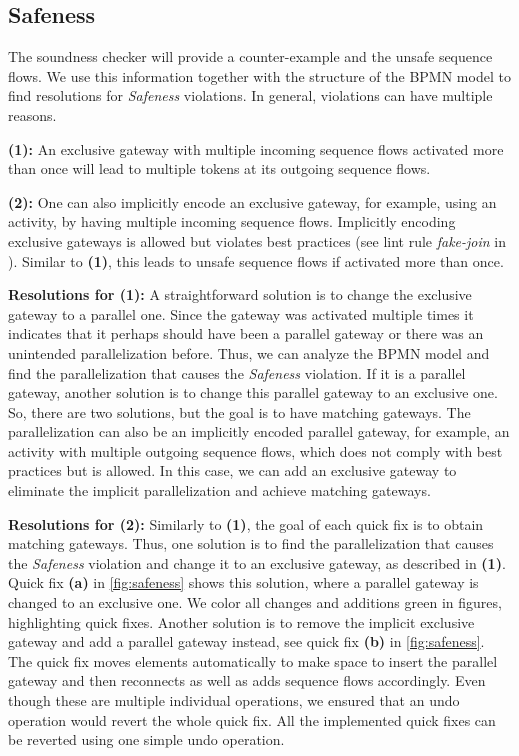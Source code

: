 \documentclass[runningheads]{llncs}
\begin{document}
\subsection{Safeness} \label{subsec:safeness}
The soundness checker will provide a counter-example and the unsafe sequence flows.
We use this information together with the structure of the BPMN model to find resolutions for \textit{Safeness} violations.
In general, violations can have multiple reasons.

\textbf{(1):} An exclusive gateway with multiple incoming sequence flows activated more than once will lead to multiple tokens at its outgoing sequence flows.

\textbf{(2):} One can also implicitly encode an exclusive gateway, for example, using an activity, by having multiple incoming sequence flows.
Implicitly encoding exclusive gateways is allowed but violates best practices (see lint rule \textit{fake-join} in \cite{camundaservicesgmbhBpmnlint2024}).
Similar to \textbf{(1)}, this leads to unsafe sequence flows if activated more than once.


\textbf{Resolutions for (1):} A straightforward solution is to change the exclusive gateway to a parallel one.
Since the gateway was activated multiple times it indicates that it perhaps should have been a parallel gateway or there was an unintended parallelization before.
Thus, we can analyze the BPMN model and find the parallelization that causes the \textit{Safeness} violation.
If it is a parallel gateway, another solution is to change this parallel gateway to an exclusive one.
So, there are two solutions, but the goal is to have matching gateways.
The parallelization can also be an implicitly encoded parallel gateway, for example, an activity with multiple outgoing sequence flows, which does not comply with best practices but is allowed.
In this case, we can add an exclusive gateway to eliminate the implicit parallelization and achieve matching gateways.

\textbf{Resolutions for (2):} Similarly to \textbf{(1)}, the goal of each quick fix is to obtain matching gateways.
Thus, one solution is to find the parallelization that causes the \textit{Safeness} violation and change it to an exclusive gateway, as described in \textbf{(1)}.
Quick fix \textbf{(a)} in \autoref{fig:safeness} shows this solution, where a parallel gateway is changed to an exclusive one.
We color all changes and additions green in figures, highlighting quick fixes.
Another solution is to remove the implicit exclusive gateway and add a parallel gateway instead, see quick fix \textbf{(b)} in \autoref{fig:safeness}.
The quick fix moves elements automatically to make space to insert the parallel gateway and then reconnects as well as adds sequence flows accordingly.
Even though these are multiple individual operations, we ensured that an undo operation would revert the whole quick fix.
All the implemented quick fixes can be reverted using one simple undo operation.
\end{document}
